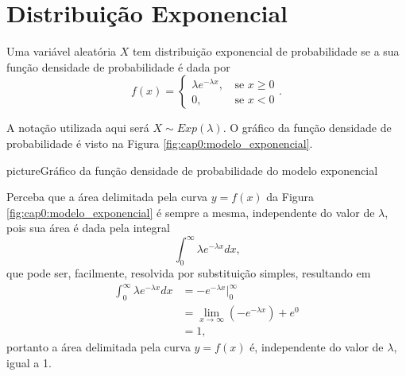 \documentclass[11pt,fleqn]{book}
\numberwithin{mpicture}{chapter}
\numberwithin{mtable}{chapter}
\numberwithin{mframe}{chapter}
\begin{document}
\section{Distribuição Exponencial}

Uma variável aleatória $X$ tem distribuição exponencial de probabilidade se a sua função densidade de probabilidade é dada por
\[
	f(x)=\begin{cases}
		\lambda e^{-\lambda x}\text{,}&\text{ se }x\geqslant 0\\
		0\text{,}&\text{ se }x<0
	\end{cases}
	\text{.}
\]

A notação utilizada aqui será $X\sim Exp(\lambda)$. O gráfico da função densidade de probabilidade é visto na Figura \ref{fig:cap0:modelo_exponencial}.

\begin{sidepicture}{2cm}{picture}{Gráfico da função densidade de probabilidade do modelo exponencial}
	\label{fig:cap0:modelo_exponencial}
\end{sidepicture}

\begin{remark}
	Perceba que a área delimitada pela curva $y=f(x)$ da Figura \ref{fig:cap0:modelo_exponencial} é sempre a mesma, independente do valor de $\lambda$, pois sua área é dada pela integral
	\[
		\int_{0}^{\infty} \lambda e^{-\lambda x}dx
		\text{,}
	\]
	que pode ser, facilmente, resolvida por substituição simples, resultando em
	\begin{align*}
		\int_{0}^{\infty} \lambda e^{-\lambda x}dx &= -e^{-\lambda x}\Big|_{0}^{\infty}\\ 
													&= \lim_{x\to \infty} (-e^{-\lambda x}) + e^0\\
													&=1
		\text{,}
	\end{align*}
	portanto a área delimitada pela curva $y=f(x)$ é, independente do valor de $\lambda$, igual a 1.
\end{remark}
\end{document}
